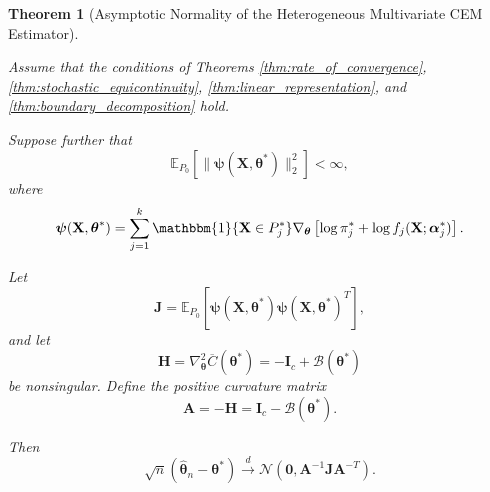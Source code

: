 \documentclass[pdflatex,sn-mathphys-ay]{sn-jnl}%
\let\oldtheta\theta
\renewcommand{\theta}{\boldsymbol{\oldtheta}}
\let\oldalpha\alpha
\renewcommand{\alpha}{\boldsymbol{\oldalpha}}
\theoremstyle{thmstyleone}%
\newtheorem{theorem}{Theorem}%
\theoremstyle{thmstyletwo}%
\theoremstyle{thmstylethree}%
\begin{document}

\begin{theorem}[Asymptotic Normality of the Heterogeneous Multivariate CEM Estimator]
\label{thm:final_normality}

Assume that the conditions of Theorems
\ref{thm:rate_of_convergence},
\ref{thm:stochastic_equicontinuity},
\ref{thm:linear_representation}, and
\ref{thm:boundary_decomposition}
hold.

Suppose further that
\[
    \mathbb{E}_{P_0}
    \left[
        \|
            \boldsymbol{\psi}
            (\mathbf{X},\boldsymbol{\theta}^*)
        \|_2^2
    \right]
    <
    \infty,
\]
where
\[
    \boldsymbol{\psi}
    (\mathbf{X},\boldsymbol{\theta}^*)
    =
    \sum_{j=1}^k
    \mathbbm{1}
    \{
        \mathbf{X}\in P_j^*
    \}
    \nabla_{\boldsymbol{\theta}}
    \left[
        \log \pi_j^*
        +
        \log f_j
        (\mathbf{X};\boldsymbol{\alpha}_j^*)
    \right].
\]

Let
\[
    \mathbf{J}
    =
    \mathbb{E}_{P_0}
    \left[
        \boldsymbol{\psi}
        (\mathbf{X},\boldsymbol{\theta}^*)
        \boldsymbol{\psi}
        (\mathbf{X},\boldsymbol{\theta}^*)^T
    \right],
\]
and let
\[
    \mathbf{H}
    =
    \nabla_{\boldsymbol{\theta}}^2
    \overline{C}
    (\boldsymbol{\theta}^*)
    =
    -\mathbf{I}_c
    +
    \mathcal{B}
    (\boldsymbol{\theta}^*)
\]
be nonsingular. Define the positive curvature matrix
\[
    \mathbf{A}
    =
    -\mathbf{H}
    =
    \mathbf{I}_c
    -
    \mathcal{B}
    (\boldsymbol{\theta}^*).
\]

Then
\[
    \sqrt{n}
    \left(
        \widehat{\boldsymbol{\theta}}_n
        -
        \boldsymbol{\theta}^*
    \right)
    \xrightarrow{d}
    \mathcal{N}
    \left(
        \mathbf{0},
        \mathbf{A}^{-1}
        \mathbf{J}
        \mathbf{A}^{-T}
    \right).
\]

\end{theorem}
\end{document}
